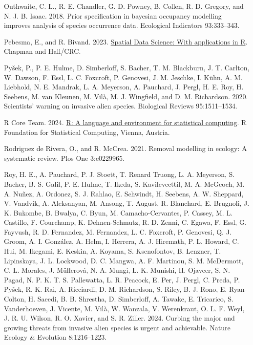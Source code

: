 \documentclass[
  11pt,
  a4paper,
]{article}
\newlength{\cslhangindent}
\newenvironment{CSLReferences}[2] %
 {\begin{list}{}{%
  \setlength{\itemindent}{0pt}
  \setlength{\leftmargin}{0pt}
  \setlength{\parsep}{0pt}
  \ifodd #1
   \setlength{\leftmargin}{\cslhangindent}
   \setlength{\itemindent}{-1\cslhangindent}
  \fi
  \setlength{\itemsep}{#2\baselineskip}}}
 {\end{list}}
\begin{document}
\begin{CSLReferences}{1}{0}
Outhwaite, C. L., R. E. Chandler, G. D. Powney, B. Collen, R. D. Gregory, and N. J. B. Isaac. 2018. Prior specification in bayesian occupancy modelling improves analysis of species occurrence data. Ecological Indicators 93:333--343.

Pebesma, E., and R. Bivand. 2023. \href{https://doi.org/10.1201/9780429459016}{{Spatial Data Science: With applications in R}}. {Chapman and Hall/CRC}.

Pyšek, P., P. E. Hulme, D. Simberloff, S. Bacher, T. M. Blackburn, J. T. Carlton, W. Dawson, F. Essl, L. C. Foxcroft, P. Genovesi, J. M. Jeschke, I. Kühn, A. M. Liebhold, N. E. Mandrak, L. A. Meyerson, A. Pauchard, J. Pergl, H. E. Roy, H. Seebens, M. van Kleunen, M. Vilà, M. J. Wingfield, and D. M. Richardson. 2020. Scientists' warning on invasive alien species. Biological Reviews 95:1511--1534.

R Core Team. 2024. \href{https://www.R-project.org/}{R: A language and environment for statistical computing}. R Foundation for Statistical Computing, Vienna, Austria.

Rodriguez de Rivera, O., and R. McCrea. 2021. Removal modelling in ecology: A systematic review. Plos One 3:e0229965.

Roy, H. E., A. Pauchard, P. J. Stoett, T. Renard Truong, L. A. Meyerson, S. Bacher, B. S. Galil, P. E. Hulme, T. Ikeda, S. Kavileveettil, M. A. McGeoch, M. A. Nuñez, A. Ordonez, S. J. Rahlao, E. Schwindt, H. Seebens, A. W. Sheppard, V. Vandvik, A. Aleksanyan, M. Ansong, T. August, R. Blanchard, E. Brugnoli, J. K. Bukombe, B. Bwalya, C. Byun, M. Camacho-Cervantes, P. Cassey, M. L. Castillo, F. Courchamp, K. Dehnen-Schmutz, R. D. Zenni, C. Egawa, F. Essl, G. Fayvush, R. D. Fernandez, M. Fernandez, L. C. Foxcroft, P. Genovesi, Q. J. Groom, A. I. González, A. Helm, I. Herrera, A. J. Hiremath, P. L. Howard, C. Hui, M. Ikegami, E. Keskin, A. Koyama, S. Ksenofontov, B. Lenzner, T. Lipinskaya, J. L. Lockwood, D. C. Mangwa, A. F. Martinou, S. M. McDermott, C. L. Morales, J. Müllerová, N. A. Mungi, L. K. Munishi, H. Ojaveer, S. N. Pagad, N. P. K. T. S. Pallewatta, L. R. Peacock, E. Per, J. Pergl, C. Preda, P. Pyšek, R. K. Rai, A. Ricciardi, D. M. Richardson, S. Riley, B. J. Rono, E. Ryan-Colton, H. Saeedi, B. B. Shrestha, D. Simberloff, A. Tawake, E. Tricarico, S. Vanderhoeven, J. Vicente, M. Vilà, W. Wanzala, V. Werenkraut, O. L. F. Weyl, J. R. U. Wilson, R. O. Xavier, and S. R. Ziller. 2024. Curbing the major and growing threats from invasive alien species is urgent and achievable. Nature Ecology \& Evolution 8:1216--1223.


\end{CSLReferences}
\end{document}
